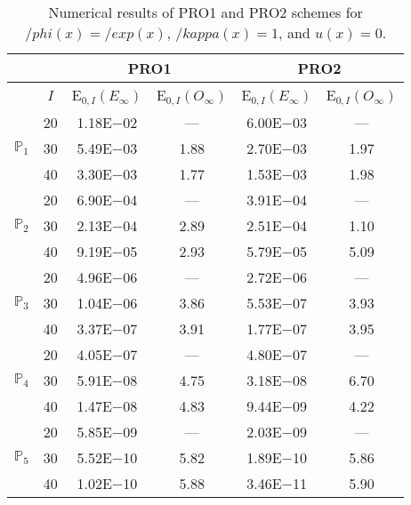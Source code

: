 \begin{table}[H]
\caption{Numerical results of PRO1 and PRO2 schemes for $/phi(x)=/exp(x)$, $/kappa(x)=1$, and $u(x)=0$.}
\setlength{\tabcolsep}{5pt}
\centering
\begin{tabular}{@{}l c c c c c@{}}
\toprule
 &  & \multicolumn{2}{c}{PRO1} & \multicolumn{2}{c}{PRO2}\\
\midrule
 & $I$ & E$_{0,I}(E_{\infty})$ & E$_{0,I}(O_{\infty})$ & E$_{0,I}(E_{\infty})$ & E$_{0,I}(O_{\infty})$\\
\midrule
\multirow{3}{*}{$\mathbb{P}_{1}$}
 & 20 & 1.18E$-$02 & --- & 6.00E$-$03 & ---\\
 & 30 & 5.49E$-$03 & 1.88 & 2.70E$-$03 & 1.97 \\
 & 40 & 3.30E$-$03 & 1.77 & 1.53E$-$03 & 1.98 \\
\midrule
\multirow{3}{*}{$\mathbb{P}_{2}$}
 & 20 & 6.90E$-$04 & --- & 3.91E$-$04 & ---\\
 & 30 & 2.13E$-$04 & 2.89 & 2.51E$-$04 & 1.10 \\
 & 40 & 9.19E$-$05 & 2.93 & 5.79E$-$05 & 5.09 \\
\midrule
\multirow{3}{*}{$\mathbb{P}_{3}$}
 & 20 & 4.96E$-$06 & --- & 2.72E$-$06 & ---\\
 & 30 & 1.04E$-$06 & 3.86 & 5.53E$-$07 & 3.93 \\
 & 40 & 3.37E$-$07 & 3.91 & 1.77E$-$07 & 3.95 \\
\midrule
\multirow{3}{*}{$\mathbb{P}_{4}$}
 & 20 & 4.05E$-$07 & --- & 4.80E$-$07 & ---\\
 & 30 & 5.91E$-$08 & 4.75 & 3.18E$-$08 & 6.70 \\
 & 40 & 1.47E$-$08 & 4.83 & 9.44E$-$09 & 4.22 \\
\midrule
\multirow{3}{*}{$\mathbb{P}_{5}$}
 & 20 & 5.85E$-$09 & --- & 2.03E$-$09 & ---\\
 & 30 & 5.52E$-$10 & 5.82 & 1.89E$-$10 & 5.86 \\
 & 40 & 1.02E$-$10 & 5.88 & 3.46E$-$11 & 5.90 \\
\bottomrule
\end{tabular}
\label{Table:PRO:Test1}
\end{table}
